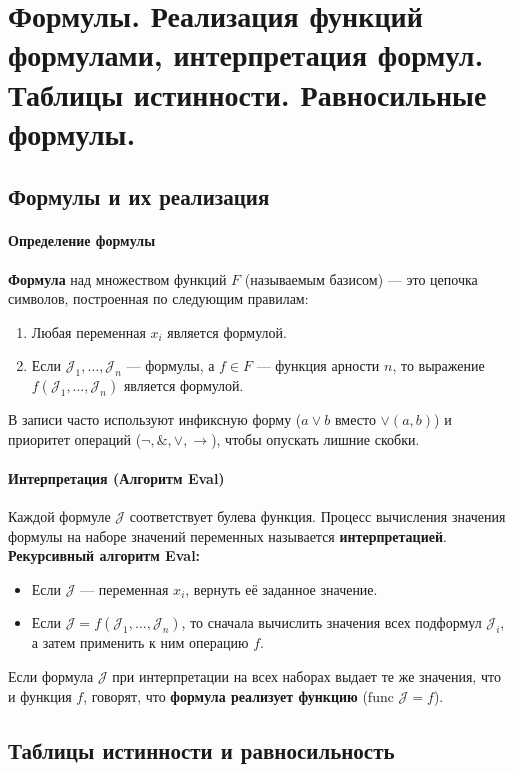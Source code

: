\section{Формулы. Реализация функций формулами, интерпретация формул. Таблицы истинности. Равносильные формулы.}

\subsection*{Формулы и их реализация}

\paragraph{Определение формулы}
\textbf{Формула} над множеством функций $F$ (называемым базисом) — это цепочка символов, построенная по следующим правилам:
\begin{enumerate}
    \item Любая переменная $x_i$ является формулой.
    \item Если $\mathcal{J}_1, \dots, \mathcal{J}_n$ — формулы, а $f \in F$ — функция арности $n$, то выражение $f(\mathcal{J}_1, \dots, \mathcal{J}_n)$ является формулой.
\end{enumerate}
В записи часто используют инфиксную форму ($a \lor b$ вместо $\lor(a, b)$) и приоритет операций ($\neg, \&, \lor, \to$), чтобы опускать лишние скобки.

\paragraph{Интерпретация (Алгоритм Eval)}
Каждой формуле $\mathcal{J}$ соответствует булева функция. Процесс вычисления значения формулы на наборе значений переменных называется \textbf{интерпретацией}.
\textbf{Рекурсивный алгоритм Eval:}
\begin{itemize}
    \item Если $\mathcal{J}$ — переменная $x_i$, вернуть её заданное значение.
    \item Если $\mathcal{J} = f(\mathcal{J}_1, \dots, \mathcal{J}_n)$, то сначала вычислить значения всех подформул $\mathcal{J}_i$, а затем применить к ним операцию $f$.
\end{itemize}
Если формула $\mathcal{J}$ при интерпретации на всех наборах выдает те же значения, что и функция $f$, говорят, что \textbf{формула реализует функцию} ($\text{func } \mathcal{J} = f$).

\subsection*{Таблицы истинности и равносильность}

